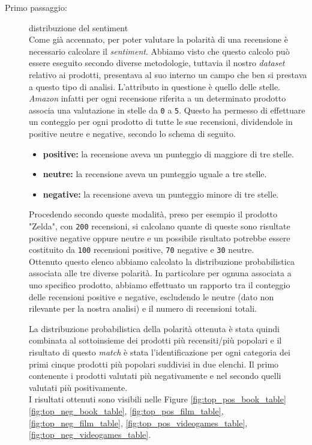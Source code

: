 		\begin{description}
		\item [Primo passaggio:] distribuzione del sentiment\\
			Come già accennato, per poter valutare la polarità di una recensione è necessario calcolare il \textit{sentiment}. Abbiamo visto che questo calcolo può essere eseguito secondo diverse metodologie, tuttavia il nostro \textit{dataset} relativo ai prodotti, presentava al suo interno un campo che ben si prestava a questo tipo di analisi. L'attributo in questione è quello delle stelle. \textit{Amazon} infatti per ogni recensione riferita a un determinato prodotto associa una valutazione in stelle da \verb|0| a \verb|5|. Questo ha permesso di effettuare un conteggio per ogni prodotto di tutte le sue recensioni, dividendole in positive neutre e negative, secondo lo schema di seguito.
			
			\begin{itemize}
				\item \textbf{positive:} la recensione aveva un punteggio di maggiore di tre stelle.
				\item \textbf{neutre:} la recensione aveva un punteggio uguale a tre stelle.
				\item \textbf{negative:} la recensione aveva un punteggio minore di tre stelle.
			\end{itemize}
			
			Procedendo secondo queste modalità, preso per esempio il prodotto "Zelda", con \verb|200| recensioni, si calcolano quante di queste sono risultate positive negative oppure neutre e un possibile risultato potrebbe essere costituito da \verb|100| recensioni positive, \verb|70| negative e \verb|30| neutre. \\		
			Ottenuto questo elenco abbiamo calcolato la distribuzione probabilistica associata alle tre diverse polarità. In particolare per ognuna associata a uno specifico prodotto, abbiamo effettuato un rapporto tra il conteggio delle recensioni positive e negative, escludendo le neutre (dato non rilevante per la nostra analisi) e il numero di recensioni totali. 
			
			La distribuzione probabilistica della polarità ottenuta è stata quindi combinata al sottoinsieme dei prodotti più recensiti/più popolari e il risultato di questo \textit{match} è stata l'identificazione per ogni categoria dei primi cinque prodotti più popolari suddivisi in due elenchi. Il primo contenente i prodotti valutati più negativamente e nel secondo quelli valutati più positivamente. \\
			I risultati ottenuti sono visibili nelle Figure \ref{fig:top_pos_book_table} \ref{fig:top_neg_book_table}, \ref{fig:top_pos_film_table}, \ref{fig:top_neg_film_table}, \ref{fig:top_pos_videogames_table}, \ref{fig:top_neg_videogames_table}.
			

\end{description}
